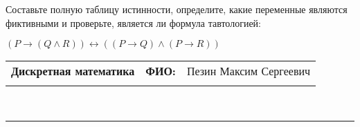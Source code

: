 \documentclass[10pt]{exam}
\newcommand{\class}{Дискретная математика}
\newcommand{\examdate}{}
\begin{document}
\begin{questions}
\begin{enumerate}[a)]
\end{enumerate}\question Составьте полную таблицу истинности, определите, какие переменные являются фиктивными и проверьте, является ли формула тавтологией:

$(P \rightarrow (Q \land R)) \leftrightarrow ((P \rightarrow Q) \land (P \rightarrow R))$

\end{questions}
\newpage
\begin{flushright}
\begin{tabular}{p{2.8in} r l}
\textbf{\class} & \textbf{ФИО:} &Пезин Максим Сергеевич
\\

\textbf{\examdate} &&\\
\end{tabular}\\
\end{flushright}
\rule[1ex]{\textwidth}{.1pt}
\end{document}

